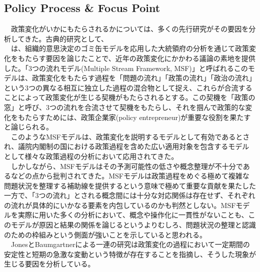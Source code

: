 \documentclass{article}
\begin{document}
\subsection{Policy Process \& Focus Point}
　政策変化がいかにもたらされるかについては、多くの先行研究がその要因を分析してきた。古典的研究として、\\
　\citet*{Kingdon1984-oq, Kingdon2013-ac}は、組織的意思決定のゴミ缶モデル\citep*{Cohen1972-ym}を応用した大統領府の分析を通じて政策変化をもたらす要因を論じたことで、近年の政策変化にかかわる議論の素地を提供した。「3つの流れモデル(Multiple Stream Framework, MSF)」と呼ばれるこのモデルは、政策変化をもたらす過程を「問題の流れ」「政策の流れ」「政治の流れ」という3つの異なる相互に独立した過程の混合物として捉え、これらが合流することによって政策変化が生じる契機がもたらされるとする。この契機を「政策の窓」と呼び、3つの流れを合流させて契機をもたらし、それを掴んで政策的な変化をもたらすためには、政策企業家(policy entrepreneur)が重要な役割を果たすと論じられる。\citep*{Kingdon1984-oq, Kingdon2013-ac}\\
　このようなMSFモデルは、政策変化を説明するモデルとして有効であるとされ、議院内閣制の国における政策過程を含めた広い適用対象を包含するモデルとして様々な政策過程の分析において応用されてきた。\citep*{Rawat2016-ew,Jones2016-lc}\\
　しかしながら、MSFモデルはその予測可能性の低さ\citep*{}や概念整理が不十分である\citep*{John2018-im}などの点から批判されてきた。MSFモデルは政策過程をめぐる極めて複雑な問題状況を整理する補助線を提供するという意味で極めて重要な貢献を果たした一方で、「3つの流れ」とされる概念間には十分な対応関係は存在せず、それぞれの流れが具体的にいかなる要素を内包しているのかも判然としない。MSFモデルを実際に用いた多くの分析において、概念や操作化に一貫性がない\citep*{Jones2016-lc}ことも、このモデルが原因と結果の関係を論じるというよりむしろ、問題状況の整理と認識のための枠組みという側面が強いことを示していると思われる。\\
　JonesとBaumgartnerによる一連の研究\citep*{Baumgartner2010-rl, Baumgartner2020-ee, Baumgartner2009-eb}は政策変化の過程において一定期間の安定性と短期の急激な変動という特徴が存在することを指摘し、そうした現象が生じる要因を分析している。\\
\end{document}
